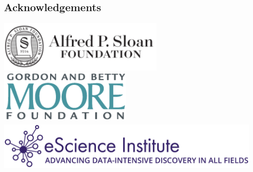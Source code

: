 \documentclass[a0, landscape]{a0poster}
\begin{document}
\begin{multicols}{3}
\subsection*{Acknowledgements} \footnotesize

\includegraphics[height=2.6cm]{SloanLogo.png}
\includegraphics[height=2.6cm]{MooreFdn.png}
\includegraphics[height=2.6cm]{eSciencelogo.png}

\end{multicols}
\end{document}
